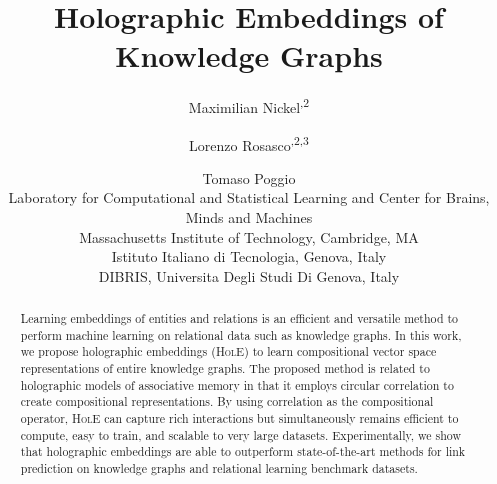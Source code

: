\documentclass[letterpaper]{article}
\newcommand{\hole}{\textsc{HolE}\xspace}
\begin{document}
\newcommand{\inst}[1]{\textsuperscript{\normalfont #1}}
\title{Holographic Embeddings of Knowledge Graphs}
\author{Maximilian Nickel\inst{1,2} \and Lorenzo Rosasco\inst{1,2,3} \and Tomaso Poggio\inst{1}\\
  \inst{1}Laboratory for Computational and
  Statistical Learning and Center for Brains, Minds and Machines\\Massachusetts Institute of
  Technology, Cambridge, MA\\
  \inst{2}Istituto Italiano di Tecnologia, Genova, Italy\\
  \inst{3}DIBRIS, Universita Degli Studi Di Genova, Italy
}
\maketitle
\begin{abstract}
  Learning embeddings of entities and relations is an efficient and versatile
  method to perform machine learning on relational data such as knowledge graphs.
In this work, we propose holographic embeddings (\hole) to learn compositional
  vector space representations of entire knowledge graphs.
The proposed method is related to holographic models of associative memory in
  that it employs circular correlation to create compositional representations.
By using correlation as the compositional operator, \hole can capture rich
  interactions but simultaneously remains efficient to compute, easy to train, and
  scalable to very large datasets.
Experimentally, we show that holographic embeddings are able to
  outperform state-of-the-art methods for link prediction on knowledge graphs and
  relational learning benchmark datasets.
\end{abstract}

\noindent 
\end{document}
